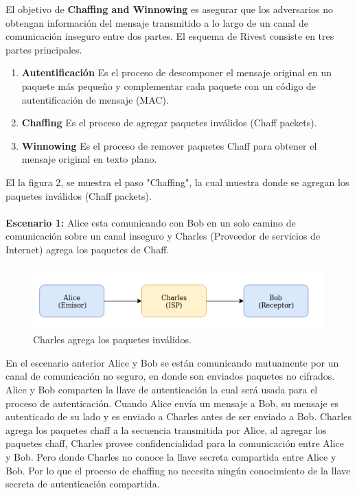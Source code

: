 \documentclass[12pt, a4paper, titlepage]{article}
\begin{document}
		El objetivo de \textbf{Chaffing and Winnowing} es asegurar que los adversarios no obtengan información del mensaje transmitido a lo largo de un canal de comunicación inseguro entre dos partes. El esquema de Rivest consiste en tres partes principales.
		\begin{enumerate}
		    \item \textbf{Autentificación} Es el proceso de descomponer el mensaje original en un paquete más pequeño y complementar cada paquete con un código de autentificación de mensaje (MAC).
		    \item \textbf{Chaffing} Es el proceso de agregar paquetes inválidos (Chaff packets).
		    \item \textbf{Winnowing} Es el proceso de remover paquetes Chaff para obtener el mensaje original en texto plano.
		\end{enumerate}
		
		El la figura 2, se muestra el paso "Chaffing", la cual muestra donde se agregan los paquetes inválidos (Chaff packets).
		\paragraph{}
		\textbf{Escenario 1:} Alice esta comunicando con Bob en un solo camino de comunicación sobre un canal inseguro y Charles (Proveedor de servicios de Internet) agrega los paquetes de Chaff.\\
		\begin{figure}[!htb]
			\begin{center}	                  \includegraphics[width=14cm]{./imagenes/chaffProcess.png}
				\caption{Charles agrega los paquetes inválidos.}
			\end{center}
		\end{figure}
		
		En el escenario anterior Alice y Bob se están comunicando mutuamente por un canal de comunicación no seguro, en donde son enviados paquetes no cifrados. Alice y Bob comparten la llave de autenticación la cual será usada para el proceso de autenticación. Cuando Alice envía un mensaje a Bob, su mensaje es autenticado de su lado y es enviado a Charles antes de ser enviado a Bob. Charles agrega los paquetes chaff a la secuencia transmitida por Alice, al agregar los paquetes chaff, Charles provee confidencialidad para la comunicación entre Alice y Bob. Pero donde Charles no conoce la llave secreta compartida entre Alice y Bob. Por lo que el proceso de chaffing no necesita ningún conocimiento de la llave secreta de autenticación compartida.
\end{document}
